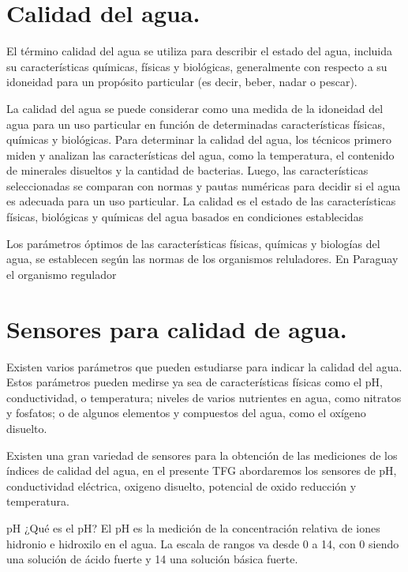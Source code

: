 \section{Calidad del agua.}

El término calidad del agua se utiliza para describir el estado del agua, incluida su características químicas, físicas y biológicas, generalmente con respecto a su idoneidad para un propósito particular (es decir, beber, nadar o pescar). \cite{waterquality}

La calidad del agua se puede considerar como una medida de la idoneidad del agua para un uso particular en función de determinadas características físicas, químicas y biológicas. Para determinar la calidad del agua, los técnicos primero miden y analizan las características del agua, como la temperatura, el contenido de minerales disueltos y la cantidad de bacterias. Luego, las características seleccionadas se comparan con normas y pautas numéricas para decidir si el agua es adecuada para un uso particular. La calidad es el estado de las características físicas, biológicas y químicas del agua basados en condiciones establecidas

Los par\'ametros \'optimos de las caracter\'isticas f\'isicas, qu\'imicas y biolog\'ias del agua, se establecen seg\'un las normas de los organismos reluladores. En Paraguay el organismo regulador 

\section{Sensores para calidad de agua.}
Existen varios parámetros que pueden estudiarse para indicar la calidad del agua. Estos parámetros pueden medirse ya sea de características físicas como el pH, conductividad, o temperatura; niveles de varios nutrientes en agua, como nitratos y fosfatos; o de algunos elementos y compuestos del agua, como el oxígeno disuelto. 

Existen una gran variedad de sensores para la obtenci\'on de las mediciones de los \'indices de calidad del agua, en el presente TFG abordaremos los sensores de pH, conductividad el\'ectrica, oxigeno disuelto, potencial de oxido reducci\'on y temperatura. 

%

pH 
¿Qué es el pH?
El pH es la medición de la concentración relativa de iones hidronio e hidroxilo en el agua. La escala de rangos va desde 0 a 14, con 0 siendo una solución de ácido fuerte y 14 una solución básica fuerte.

